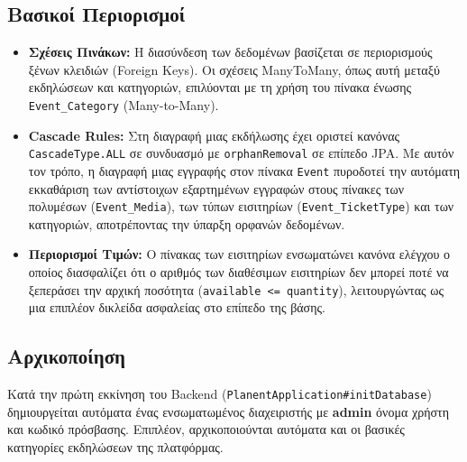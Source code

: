\documentclass[12pt]{fphw}
\newcommand{\en}[1]{\foreignlanguage{english}{#1}}
\begin{document}
\subsection{Βασικοί Περιορισμοί}
\begin{itemize}
    \item \textbf{Σχέσεις Πινάκων:} Η διασύνδεση των δεδομένων βασίζεται σε περιορισμούς ξένων κλειδιών (\en{Foreign Keys}). Οι σχέσεις ManyToMany, όπως αυτή μεταξύ εκδηλώσεων και κατηγοριών, επιλύονται με τη χρήση του πίνακα ένωσης \en{\texttt{Event\_Category}} (\en{Many-to-Many}).
    \item \textbf{\en{Cascade Rules}:} Στη διαγραφή μιας εκδήλωσης έχει οριστεί κανόνας \en{\texttt{CascadeType.ALL}} σε συνδυασμό με \en{\texttt{orphanRemoval}} σε επίπεδο \en{JPA}. Με αυτόν τον τρόπο, η διαγραφή μιας εγγραφής στον πίνακα \en{\texttt{Event}} πυροδοτεί την αυτόματη εκκαθάριση των αντίστοιχων εξαρτημένων εγγραφών στους πίνακες των πολυμέσων (\en{\texttt{Event\_Media}}), των τύπων εισιτηρίων (\en{\texttt{Event\_TicketType}}) και των κατηγοριών, αποτρέποντας την ύπαρξη ορφανών δεδομένων.
    \item \textbf{Περιορισμοί Τιμών:} Ο πίνακας των εισιτηρίων ενσωματώνει κανόνα ελέγχου ο οποίος διασφαλίζει ότι ο αριθμός των διαθέσιμων εισιτηρίων δεν μπορεί ποτέ να ξεπεράσει την αρχική ποσότητα (\en{\texttt{available <= quantity}}), λειτουργώντας ως μια επιπλέον δικλείδα ασφαλείας στο επίπεδο της βάσης.
\end{itemize}


\subsection{Αρχικοποίηση}
Κατά την πρώτη εκκίνηση του \en{Backend} (\en{\texttt{PlanentApplication\#initDatabase}}) δημιουργείται αυτόματα ένας ενσωματωμένος διαχειριστής με \en{\textbf{admin}} όνομα χρήστη και κωδικό πρόσβασης. Επιπλέον, αρχικοποιούνται αυτόματα και οι βασικές κατηγορίες εκδηλώσεων της πλατφόρμας.

\newpage

\end{document}
